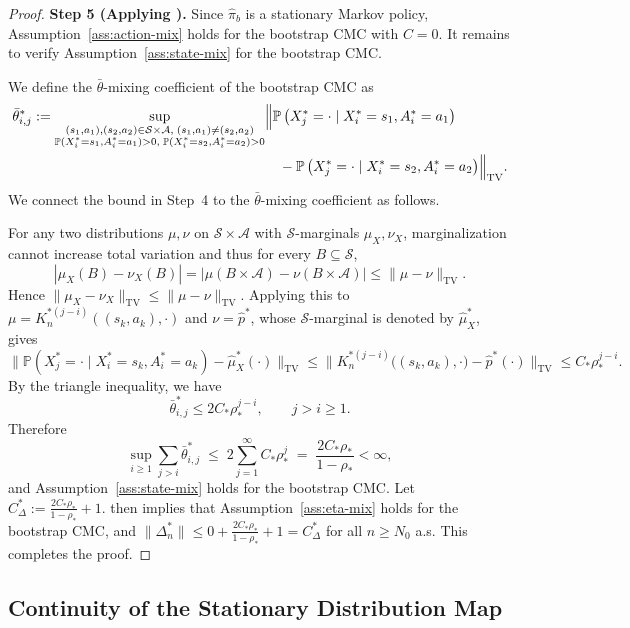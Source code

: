 \documentclass{article}
\numberwithin{equation}{section}
\newcommand{\lp}{\left(}
\newcommand{\rp}{\right)}
\newcommand{\Pbb}{\mathbb{P}}
\newcommand{\prob}{\Pbb}
\begin{document}
\begin{proof}
\medskip\noindent\textbf{Step 5 (Applying \citet[Lemma 3]{banerjee2025off}).}
Since $\hat\pi_b$ is a stationary Markov policy, Assumption~\ref{ass:action-mix} holds for the bootstrap CMC with $C=0$. It remains to verify Assumption~\ref{ass:state-mix} for the bootstrap CMC. 

We define the $\bar \theta$-mixing coefficient of the bootstrap CMC as 
\begin{align*}
\bar\theta_{i,j}^\ast :=
\underset{\substack{(s_1,a_1), (s_2,a_2) \in \mathcal S \times \mathcal A, \;(s_1,a_1)\neq(s_2,a_2)\\ \prob(X_i^\ast=s_1,A_i^\ast=a_1)>0,\;\prob(X_i^\ast=s_2,A_i^\ast=a_2)>0}}{\sup}
&\Bigl\|\prob\lp X_j^\ast=\cdot\mid X_i^\ast=s_1,A_i^\ast=a_1\rp \\
&\quad -\prob\lp X_j^\ast=\cdot\mid X_i^\ast=s_2,A_i^\ast=a_2\rp\Bigr\|_{\mathrm{TV}}.
\end{align*}
We connect the bound in Step~4 to the $\bar\theta$-mixing coefficient as follows.

For any two distributions $\mu,\nu$ on $\mathcal{S}\times\mathcal{A}$ with $\mathcal{S}$-marginals $\mu_X,\nu_X$, marginalization cannot increase total variation and thus for every $B\subseteq\mathcal{S}$,
\[
|\mu_X(B)-\nu_X(B)| = |\mu(B\times\mathcal{A})-\nu(B\times\mathcal{A})| \le \|\mu-\nu\|_{\mathrm{TV}}.
\]
Hence $\|\mu_X-\nu_X\|_{\mathrm{TV}}\le\|\mu-\nu\|_{\mathrm{TV}}$. Applying this to $\mu = K_n^{\ast(j-i)}((s_k,a_k),\cdot)$ and $\nu = \hat p^\ast$, whose $\mathcal{S}$-marginal is denoted by $\hat\mu_X^\ast$, gives
\[
\bigl\|\mathbb{P}(X_j^\ast=\cdot\mid X_i^\ast=s_k,A_i^\ast=a_k)-\hat\mu_X^\ast(\cdot)\bigr\|_{\mathrm{TV}}
\le \bigl\|K_n^{\ast(j-i)}\bigl((s_k,a_k),\cdot\bigr)-\hat p^\ast(\cdot)\bigr\|_{\mathrm{TV}}
\le C_\ast\rho_\ast^{j-i}.
\]
By the triangle inequality, we have
\[
\bar\theta_{i,j}^\ast \le 2C_\ast\rho_\ast^{j-i}, \qquad j>i\ge 1.
\]
Therefore
\[
\sup_{i\ge 1}\sum_{j>i}\bar\theta_{i,j}^\ast \;\le\; 2 \sum_{j=1}^{\infty} C_\ast \rho_\ast^j \;=\; \frac{2C_\ast\rho_\ast}{1-\rho_\ast} < \infty,
\]
and Assumption~\ref{ass:state-mix} holds for the bootstrap CMC. 
Let $C_\Delta^\ast := \frac{2C_\ast\rho_\ast}{1-\rho_\ast}+1$.
\citet[Lemma~3]{banerjee2025off} then implies that Assumption~\ref{ass:eta-mix} holds for the bootstrap CMC, and $\|\Delta_n^\ast\|\le 0+\frac{2C_\ast\rho_\ast}{1-\rho_\ast}+1 = C_\Delta^\ast$ for all $n\ge N_0$ a.s. 
This completes the proof.
\end{proof}

\subsection{Continuity of the Stationary Distribution Map}
\label{app:lem:statdist}
\end{document}
